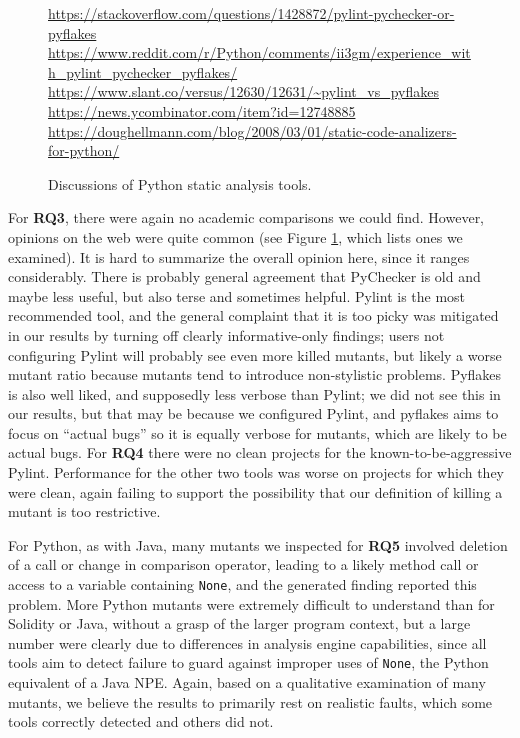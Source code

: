 \begin{figure}
  {\scriptsize
    \raggedright
  \url{https://stackoverflow.com/questions/1428872/pylint-pychecker-or-pyflakes}\\
  \url{https://www.reddit.com/r/Python/comments/ii3gm/experience_with_pylint_pychecker_pyflakes/}\\
  \url{https://www.slant.co/versus/12630/12631/~pylint_vs_pyflakes}\\
  \url{https://news.ycombinator.com/item?id=12748885}\\
  \url{https://doughellmann.com/blog/2008/03/01/static-code-analizers-for-python/}\\
  }
\caption{Discussions of Python static analysis tools.}
\label{fig:blogpython}
\end{figure}

For {\bf RQ3}, there were again no academic comparisons we could find.  However, opinions on the web were quite common (see Figure \ref{fig:blogpython}, which lists ones we examined).  It is hard to summarize the overall opinion here, since it ranges considerably.  There is probably general agreement that PyChecker is old and maybe less useful, but also terse and sometimes helpful.  Pylint is the most recommended tool, and the general complaint that it is too picky was mitigated in our results by turning off clearly informative-only findings; users not configuring Pylint will probably see even more killed mutants, but likely a worse mutant ratio because mutants tend to introduce non-stylistic problems.  Pyflakes is also well liked, and supposedly less verbose than Pylint; we did not see this in our results, but that may be because we configured Pylint, and pyflakes aims to focus on ``actual bugs'' so it is equally verbose for mutants, which are likely to be actual bugs.
For {\bf RQ4} there were no clean projects for the known-to-be-aggressive Pylint.  Performance for the other two tools was worse on projects for which they were clean, again failing to support the possibility that our definition of killing a mutant is too restrictive.

For Python, as with Java, many mutants we inspected for {\bf RQ5} involved deletion of a call or change in comparison operator, leading to a likely method call or access to a variable containing {\tt None}, and the generated finding reported this problem.  More Python mutants were extremely difficult to understand than for Solidity or Java, without a grasp of the larger program context, but a large number were clearly due to differences in analysis engine capabilities, since all tools aim to detect failure to guard against improper uses of {\tt None}, the Python equivalent of a Java NPE.  Again, based on a qualitative examination of many mutants, we believe the results to primarily rest on realistic faults, which some tools correctly detected and others did not.

